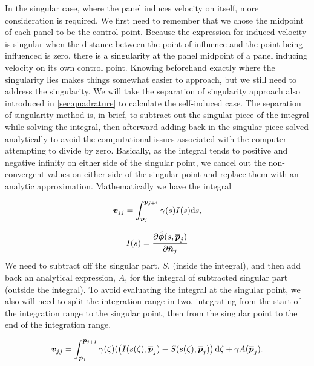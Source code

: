 In the singular case, where the panel induces velocity on itself, more consideration is required.
%
We first need to remember that we chose the midpoint of each panel to be the control point.
%
Because the expression for induced velocity is singular when the distance between the point of influence and the point being influenced is zero, there is a singularity at the panel midpoint of a panel inducing velocity on its own control point.
%
Knowing beforehand exactly where the singularity lies makes things somewhat easier to approach, but we still need to address the singularity.
%
We will take the separation of singularity approach also introduced in \cref{sec:quadrature} to calculate the self-induced case.
%
The separation of singularity method is, in brief, to subtract out the singular piece of the integral while solving the integral, then afterward adding back in the singular piece solved analytically to avoid the computational issues associated with the computer attempting to divide by zero.
%
Basically, as the integral tends to positive and negative infinity on either side of the singular point, we cancel out the non-convergent values on either side of the singular point and replace them with an analytic approximation.
%
Mathematically we have the integral

\begin{equation}
    \bm{v}_{jj} = \int_{\bm{p}_j}^{\bm{p}_{j+1}} \gamma(s) I(s) \mathrm{d} s,
\end{equation}

\where \[I(s)  = \frac{\partial \hat{\bm{\phi}}(s,\overline{\bm{p}}_j)}{\partial \hat{\bm{n}}_j}\]
%
We need to subtract off the singular part, \(S\), (inside the integral), and then add back an analytical expression, \(A\), for the integral of subtracted singular part (outside the integral).
%
To avoid evaluating the integral at the singular point, we also will need to split the integration range in two, integrating from the start of the integration range to the singular point, then from the singular point to the end of the integration range.

\begin{equation}
    \bm{v}_{jj} = \int_{\bm{p}_j}^{\bm{p}_{j+1}} \gamma(\zeta)(\left(I(s(\zeta),\overline{\bm{p}}_j) - S(s(\zeta),\overline{\bm{p}}_j) \right)\mathrm{d} \zeta + \gamma A(\overline{\bm{p}}_j).
\end{equation}
%
%

